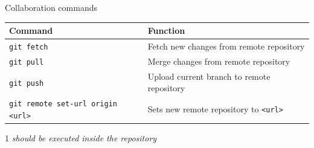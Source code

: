\documentclass[10pt, graphics, aspectratio=169, table]{beamer}
\begin{document}
    \begin{frame}{Collaboration commands}
        \begin{table}
            \centering
            \begin{threeparttable}
                \begin{tabular}{ll}
                    \toprule
                    Command & Function \\
                    \midrule
                    \texttt{git fetch} & Fetch new changes from remote repository\tnote{1} \\
                    \texttt{git pull} & Merge changes from remote repository\tnote{1} \\
                    \texttt{git push} & Upload current branch to remote repository\tnote{1} \\
                    \texttt{git remote set-url origin <url>} & Sets new remote repository to \texttt{<url>}\tnote{1} \\
                    \bottomrule
                \end{tabular}
                \begin{tablenotes}
                    \item [1]\emph{should be executed inside the repository}
                \end{tablenotes}
            \end{threeparttable}
        \end{table}
    \end{frame}
\end{document}

